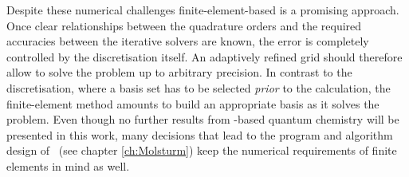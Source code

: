 Despite these numerical challenges
finite-element-based \HF is a promising approach.
Once clear relationships between the quadrature orders
and the required accuracies between the iterative solvers are known,
the error is completely controlled by the discretisation itself.
An adaptively refined grid should therefore allow to solve
the \HF problem up to arbitrary precision.
In contrast to the {\cGTO} discretisation,
where a basis set has to be selected \emph{prior} to the calculation,
the finite-element method amounts to build
an appropriate basis as it solves the problem.
Even though no further results from \FE-based quantum chemistry
will be presented in this work,
many decisions that lead to the program and algorithm design
of \molsturm~(see chapter \vref{ch:Molsturm})
keep the numerical requirements of finite elements in mind as well.
